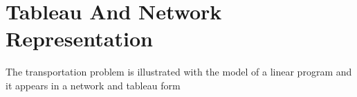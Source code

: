 \documentclass[12pt]{report}
\newcommand{\sps}{\\[0.2cm]}
\newcommand{\NI}{\noindent}
\newcommand{\dsp}{\displaystyle}
\newcommand{\tp}{Transportation Problem }
\newcommand{\stp}{transportation problem }
\newcommand{\stps}{transportation problems }
\begin{document}
%	


	\section{Tableau And Network Representation}
	The \stp is illustrated with the model of a linear program and it appears in a network and tableau form
	
\end{document}
